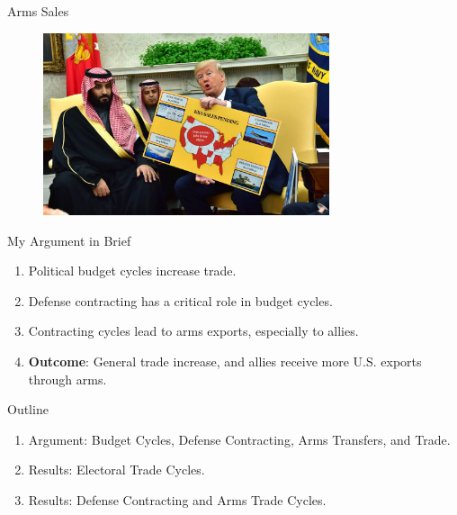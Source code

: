 \documentclass[12pt]{beamer}
\begin{document}
\begin{frame}{Arms Sales}

\begin{figure}[htbp]
		\includegraphics[width=0.75\textwidth]{trump-sales.jpg}
\end{figure}

\end{frame}
 

\begin{frame}{My Argument in Brief}

\begin{enumerate}
\item Political budget cycles increase trade.  
\pause 
\item Defense contracting has a critical role in budget cycles.
\pause 
\item Contracting cycles lead to arms exports, especially to allies. 
\pause
\item \textbf{Outcome}: General trade increase, and allies receive more U.S. exports through arms. 
\end{enumerate}

\end{frame}



\begin{frame}{Outline}

\pause
\begin{enumerate}
\item Argument: Budget Cycles, Defense Contracting, Arms Transfers, and Trade. 
\pause
\item Results: Electoral Trade Cycles. 
\pause
\item Results: Defense Contracting and Arms Trade Cycles.  
\end{enumerate}


\end{frame}
 
\end{document}
